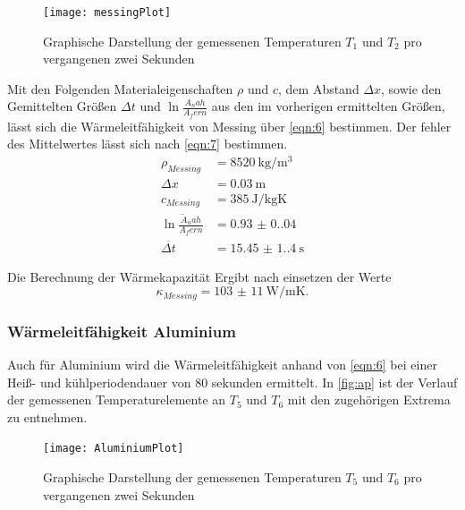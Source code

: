 \begin{figure}[H]
  \label{fig:mp}
  \centering
  \caption{Graphische Darstellung der gemessenen Temperaturen $T_1$ und $T_2$ pro vergangenen zwei Sekunden}
  \texttt{[image: messingPlot]}
\end{figure}

\noindent Mit den Folgenden Materialeigenschaften $\rho$ und $c$, dem Abstand $\Delta x$, sowie den
Gemittelten Größen $\Delta t $ und $ \ln{\frac{A_nah}{A_fern}}$ aus den im vorherigen ermittelten Größen,
lässt sich die Wärmeleitfähigkeit von Messing über \autoref{eqn:6} bestimmen. Der fehler des Mittelwertes
lässt sich nach \autoref{eqn:7} bestimmen.
\begin{align*}
  \rho_{Messing}                                &= \qty{8520}{\kilo\gram\per\cubic\meter}\\
  \Delta x                              &= \qty{0.03}{\meter}\\
  c_{Messing}                                   &= \qty{385}{\joule\per\kilo\gram\kelvin}\\
  \overline{\ln{\frac{A_nah}{A_fern}}}  &= \qty{0.93(0.04)}{}\\
  \overline{\Delta t}                   &= \qty{15.45(1.4)}{\second}
\end{align*}

\noindent Die Berechnung der Wärmekapazität Ergibt nach einsetzen der Werte
\begin{equation}
  \kappa_{Messing} = \qty{103(11)}{\watt\per\meter\kelvin}.
\end{equation}

\subsubsection{Wärmeleitfähigkeit Aluminium}
Auch für Aluminium wird die Wärmeleitfähigkeit anhand von \autoref{eqn:6} bei einer Heiß- und 
kühlperiodendauer von 80 sekunden ermittelt. In \autoref{fig:ap} ist der Verlauf der gemessenen 
Temperaturelemente an $T_5$ und $T_6$ mit den zugehörigen Extrema zu entnehmen.
\begin{figure}[H]
  \label{fig:ap}
  \centering
  \caption{Graphische Darstellung der gemessenen Temperaturen $T_5$ und $T_6$ pro vergangenen zwei Sekunden}
  \texttt{[image: AluminiumPlot]}
\end{figure}

